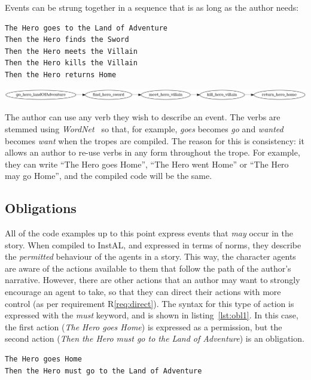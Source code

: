 \documentclass[11pt]{report}
\begin{document}
Events can be strung together in a sequence that is as long as the author needs:

\begin{lstlisting}[label={lst:seq4}, caption={A sequence of events}]
The Hero goes to the Land of Adventure
Then the Hero finds the Sword
Then the Hero meets the Villain
Then the Hero kills the Villain
Then the Hero returns Home
\end{lstlisting}

\vspace{7mm}
\centerline{\includegraphics[width=\textwidth]{seq2.png}}
\vspace{7mm}

The author can use any verb they wish to describe an event. The verbs are
stemmed using \emph{WordNet}~\citep{miller1995wordnet} so that, for example,
\emph{goes} becomes \emph{go} and \emph{wanted} becomes \emph{want} when the
tropes are compiled. The reason for this is consistency: it allows an author to
re-use verbs in any form throughout the trope. For example, they can write ``The
Hero goes Home'', ``The Hero went Home'' or ``The Hero may go Home'', and the
compiled code will be the same.

\subsection{Obligations}
\label{sec:obl-code}
All of the code examples up to this point express events that \emph{may} occur
in the story. When compiled to InstAL, and expressed in terms of norms, they
describe the \emph{permitted} behaviour of the agents in a story. This way, the
character agents are aware of the actions available to them that follow the path
of the author's narrative. However, there are other actions that an author may
want to strongly encourage an agent to take, so that they can direct their
actions with more control (as per requirement R\ref{req:direct}). The syntax for this type of action
is expressed with the \emph{must} keyword, and is shown in
listing~\ref{lst:obl1}. In this case, the first action (\emph{The Hero goes
  Home}) is expressed as a permission, but the second action (\emph{Then the
  Hero must go to the Land of Adventure}) is an obligation.

\begin{lstlisting}[label={lst:obl1}, caption={An obliged event within a trope}]
The Hero goes Home
Then the Hero must go to the Land of Adventure
\end{lstlisting}
\end{document}
